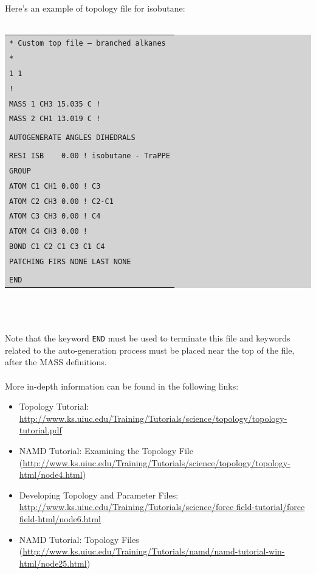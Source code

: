Here's an example of topology file for isobutane:\\\\
\colorbox{lightgray}{
\begin{tabular}{l}
\texttt{* Custom top file -- branched alkanes}\\
\texttt{*}\\
\texttt{1  1}\\
\texttt{!}\\
\texttt{MASS   1  CH3  15.035 C !}\\
\texttt{MASS   2  CH1  13.019 C !}\\\\
\texttt{AUTOGENERATE ANGLES DIHEDRALS}\\\\
\texttt{RESI ISB ~~ 0.00 ! isobutane - TraPPE}\\
\texttt{GROUP}\\
\texttt{ATOM C1 CH1    0.00 !    C3}\\
\texttt{ATOM C2 CH3    0.00 ! C2-C1}\\
\texttt{ATOM C3 CH3    0.00 !    C4}\\
\texttt{ATOM C4 CH3    0.00 !}\\
\texttt{BOND C1 C2 C1 C3 C1 C4}\\
\texttt{PATCHING FIRS NONE LAST NONE}\\\\
\texttt{END}
\end{tabular}} \\\\\\
Note that the keyword \texttt{END} must be used to terminate this file and keywords related to the auto-generation process must be placed near the top of the file, after the MASS definitions.\\\\
More in-depth information can be found in the following links:\\
\begin{itemize}
\item{Topology Tutorial}: \url{http://www.ks.uiuc.edu/Training/Tutorials/science/topology/topology-tutorial.pdf}
\item{NAMD Tutorial}: Examining the Topology File (\url{http://www.ks.uiuc.edu/Training/Tutorials/science/topology/topology-html/node4.html})
\item{Developing Topology and Parameter Files}: \url{http://www.ks.uiuc.edu/Training/Tutorials/science/force field-tutorial/force field-html/node6.html}
\item{NAMD Tutorial}: Topology Files (\url{http://www.ks.uiuc.edu/Training/Tutorials/namd/namd-tutorial-win-html/node25.html}) \\
\end{itemize}


